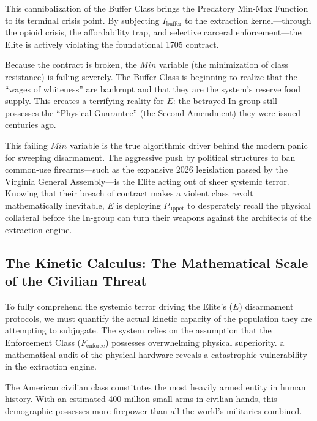 This cannibalization of the Buffer Class brings the Predatory Min-Max Function to its terminal crisis point. By subjecting $I_{\text{buffer}}$ to the extraction kernel---through the opioid crisis, the affordability trap, and selective carceral enforcement---the Elite is actively violating the foundational 1705 contract.

Because the contract is broken, the $Min$ variable (the minimization of class resistance) is failing severely. The Buffer Class is beginning to realize that the ``wages of whiteness'' are bankrupt and that they are the system's reserve food supply. This creates a terrifying reality for $E$: the betrayed In-group still possesses the ``Physical Guarantee'' (the Second Amendment) they were issued centuries ago.

This failing $Min$ variable is the true algorithmic driver behind the modern panic for sweeping disarmament. The aggressive push by political structures to ban common-use firearms---such as the expansive 2026 legislation passed by the Virginia General Assembly---is the Elite acting out of sheer systemic terror. Knowing that their breach of contract makes a violent class revolt mathematically inevitable, $E$ is deploying $P_{\text{uppet}}$ to desperately recall the physical collateral before the In-group can turn their weapons against the architects of the extraction engine.

\subsection{The Kinetic Calculus: The Mathematical Scale of the Civilian Threat}

To fully comprehend the systemic terror driving the Elite's ($E$) disarmament protocols, we must quantify the actual kinetic capacity of the population they are attempting to subjugate. The system relies on the assumption that the Enforcement Class ($F_{\text{enforce}}$) possesses overwhelming physical superiority. a mathematical audit of the physical hardware reveals a catastrophic vulnerability in the extraction engine.

The American civilian class constitutes the most heavily armed entity in human history. With an estimated 400 million small arms in civilian hands, this demographic possesses more firepower than all the world's militaries combined.

